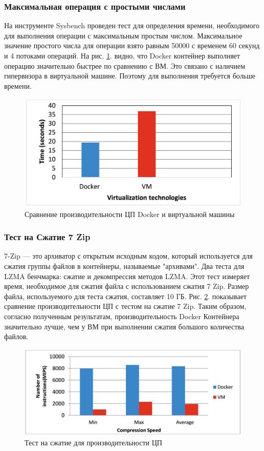 \documentclass{mirea}
\begin{document}
	\subsubsection{Максимальная операция с простыми числами}
	
	На инструменте Sysbench проведен тест для определения времени, необходимого для выполнения операции с максимальным простым числом. Максимальное значение простого числа для операции взято равным 50000 с временем 60 секунд и 4 потоками операций. На рис. \ref{fig:pic4}. видно, что Docker контейнер выполняет операцию значительно быстрее по сравнению с ВМ. Это связано с наличием гипервизора в виртуальной машине. Поэтому для выполнения требуется больше времени.
	
	\begin{figure}[H]
		\centering
		\includegraphics[width=.6\textwidth]{img4}
		\parskip=6pt
		\caption{Сравнение производительности ЦП Docker и виртуальной машины}
		\label{fig:pic4}
	\end{figure}

	\subsubsection{Тест на Сжатие 7 Zip}
	
	7-Zip — это архиватор с открытым исходным кодом, который используется для сжатия группы файлов в контейнеры, называемые "архивами". Два теста для LZMA бенчмарка: сжатие и декомпрессия методов LZMA. Этот тест измеряет время, необходимое для сжатия файла с использованием сжатия 7 Zip. Размер файла, используемого для теста сжатия, составляет 10 ГБ. Рис. \ref{fig:pic5}. показывает сравнение производительности ЦП с тестом на сжатие 7 Zip. Таким образом, согласно полученным результатам, производительность Docker Контейнера значительно лучше, чем у ВМ при выполнении сжатия большого количества файлов.
	
	\begin{figure}[H]
		\centering
		\includegraphics[width=.6\textwidth]{img5}
		\parskip=6pt
		\caption{Тест на сжатие для производительности ЦП}
		\label{fig:pic5}
	\end{figure}
\end{document}
